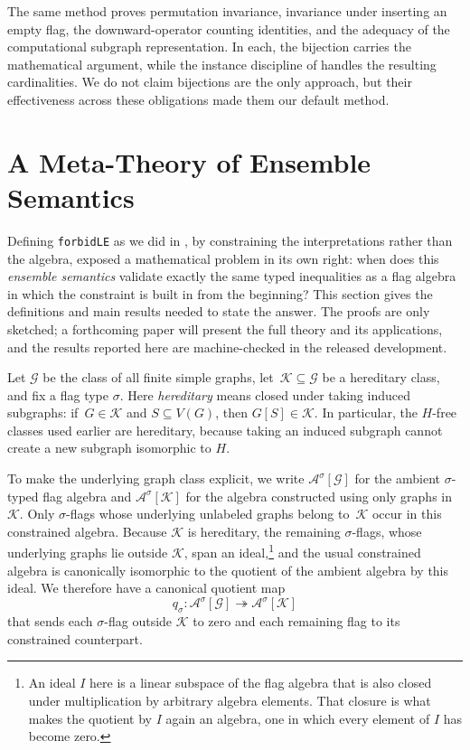 \documentclass[acmsmall,screen=true,acmthm=false]{acmart}
\newcommand{\FlagAlg}[1]{\mathcal{A}^{#1}}
\newcommand{\boldparagraph}[1]{\noindentparagraph{\textnormal{\textbf{#1}}}}
\DeclareRobustCommand{\lean}[1]{{\def\_{\textunderscore\allowbreak}\texttt{#1}}}
\begin{document}
The same method proves permutation invariance, invariance under inserting an
empty flag, the downward-operator counting identities, and the adequacy of
the computational subgraph representation.  In each, the bijection carries the
mathematical argument, while the instance discipline of 
handles the resulting cardinalities.  We do not claim bijections are the only
approach, but their effectiveness across these obligations made them our
default method.

\section{A Meta-Theory of Ensemble Semantics}
\label{sec:metatheory}

Defining \lean{forbidLE} as we did in , by constraining
the interpretations rather than the algebra, exposed a mathematical problem in
its own right: when does this \emph{ensemble semantics} validate exactly the
same typed inequalities as a flag algebra in which the constraint is built in
from the beginning?  This section gives the definitions and main results
needed to state the answer.  The proofs are only sketched; a forthcoming paper
will present the full theory and its applications, and the results reported
here are machine-checked in the released development.

\boldparagraph{The constrained positive-homomorphism space.}
Let \(\mathcal G\) be the class of all finite simple graphs, let~\(\mathcal K\subseteq\mathcal G\) be a hereditary class, and fix a flag type
\(\sigma\).  Here \emph{hereditary} means closed under taking induced
subgraphs: if~\(G\in\mathcal K\) and \(S\subseteq V(G)\), then
\(G[S]\in\mathcal K\).  In particular, the \(H\)-free classes used earlier are
hereditary, because taking an induced subgraph cannot create a new
subgraph isomorphic to \(H\).

To make the underlying graph class explicit, we write
\(\FlagAlg{\sigma}[\mathcal G]\) for the ambient
\(\sigma\)-typed flag algebra and
\(\FlagAlg{\sigma}[\mathcal K]\) for the algebra constructed using only graphs
in \(\mathcal K\).  Only \(\sigma\)-flags whose underlying unlabeled graphs
belong to~\(\mathcal K\) occur in this constrained algebra.  Because
\(\mathcal K\) is hereditary, the remaining \(\sigma\)-flags, whose underlying
graphs lie outside \(\mathcal K\), span an ideal,\footnote{An ideal \(I\) here
is a linear subspace of the flag algebra that is also closed under
multiplication by arbitrary algebra elements.  That closure is what makes the
quotient by \(I\) again an algebra, one in which every element of \(I\) has
become zero.} and the usual constrained
algebra is canonically isomorphic to the quotient of the ambient algebra by
this ideal.  We therefore have a canonical quotient map
\[
  q_\sigma:
  \FlagAlg{\sigma}[\mathcal G]
  \twoheadrightarrow
  \FlagAlg{\sigma}[\mathcal K]
\]
that sends each \(\sigma\)-flag outside \(\mathcal K\) to zero and each
remaining flag to its constrained counterpart.
\end{document}
